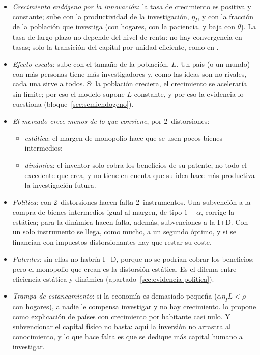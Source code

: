 \documentclass[11pt]{article}
\begin{document}
\begin{itemize}
\item \emph{Crecimiento endógeno por la innovación}: la tasa de crecimiento es positiva y constante; sube con la productividad de la investigación, $\eta_I$, y con la fracción de la población que investiga (con hogares, con la paciencia, y baja con $\theta$). La tasa de largo plazo no depende del nivel de renta: no hay convergencia en tasas; solo la transición del capital por unidad eficiente, como en .
\item \emph{Efecto escala}: sube con el tamaño de la población, $L$. Un país (o un mundo) con más personas tiene más investigadores y, como las ideas son no rivales, cada una sirve a todos. Si la población creciera, el crecimiento se aceleraría sin límite; por eso el modelo supone $L$ constante, y por eso la evidencia lo cuestiona (bloque~\ref{sec:semiendogeno}).
\item \emph{El mercado crece menos de lo que conviene}, por 2~distorsiones:
  \begin{itemize}
  \item \emph{estática}: el margen de monopolio hace que se usen pocos bienes intermedios;
  \item \emph{dinámica}: el inventor solo cobra los beneficios de su patente, no todo el excedente que crea, y no tiene en cuenta que su idea hace más productiva la investigación futura.
  \end{itemize}
\item \emph{Política}: con 2~distorsiones hacen falta 2~instrumentos. Una subvención a la compra de bienes intermedios igual al margen, de tipo $1-\alpha$, corrige la estática; para la dinámica hacen falta, además, subvenciones a la I+D\nocite{BarroSalaiMartin2004}. Con un solo instrumento se llega, como mucho, a un segundo óptimo, y si se financian con impuestos distorsionantes hay que restar su coste.
\item \emph{Patentes}: sin ellas no habría I+D, porque no se podrían cobrar los beneficios; pero el monopolio que crean es la distorsión estática. Es el dilema entre eficiencia estática y dinámica (apartado~\ref{sec:evidencia-politica}).
\item \emph{Trampa de estancamiento}: si la economía es demasiado pequeña ($\alpha\eta_IL<\rho$ con hogares), a nadie le compensa investigar y no hay crecimiento. \textcite[pp.~S95-S96]{Romer1990} lo propone como explicación de países con crecimiento por habitante casi nulo. Y subvencionar el capital físico no basta: aquí la inversión no arrastra al conocimiento, y lo que hace falta es que se dedique más capital humano a investigar\nocite{Romer1990}.

\end{itemize}
\end{document}
